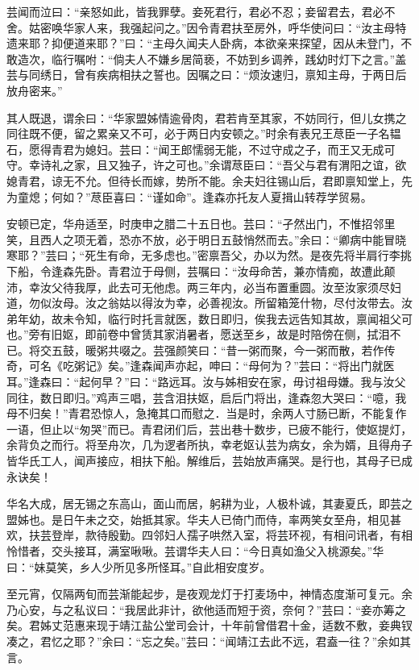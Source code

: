 \documentclass[]{article}
\begin{document}
芸闻而泣曰：``亲怒如此，皆我罪孽。妾死君行，君必不忍；妾留君去，君必不舍。姑密唤华家人来，我强起问之。''因令青君扶至房外，呼华使问曰：``汝主母特遗来耶？抑便道来耶？''曰：``主母久闻夫人卧病，本欲亲来探望，因从未登门，不敢造次，临行嘱咐：``倘夫人不嫌乡居简亵，不妨到乡调养，践幼时灯下之言。''盖芸与同绣日，曾有疾病相扶之誓也。因嘱之曰：``烦汝速归，禀知主母，于两日后放舟密来。''

其人既退，谓余曰：``华家盟姊情逾骨肉，君若肯至其家，不妨同行，但儿女携之同往既不便，留之累亲又不可，必于两日内安顿之。''时余有表兄王荩臣一子名韫石，愿得青君为媳妇。芸曰：``闻王郎懦弱无能，不过守成之子，而王又无成可守。幸诗礼之家，且又独子，许之可也。''余谓荩臣曰：``吾父与君有渭阳之谊，欲媳青君，谅无不允。但待长而嫁，势所不能。余夫妇往锡山后，君即禀知堂上，先为童熄；何如？''荩臣喜曰：``谨如命''。逢森亦托友人夏揖山转荐学贸易。

安顿已定，华舟适至，时庚申之腊二十五日也。芸曰：``孑然出门，不惟招邻里笑，且西人之项无着，恐亦不放，必于明日五鼓悄然而去。''余曰：``卿病中能冒晓寒耶？''芸曰；``死生有命，无多虑也。''密禀吾父，办以为然。是夜先将半肩行李挑下船，令逢森先卧。青君泣于母侧，芸嘱曰：``汝母命苦，兼亦情痴，故遭此颠沛，幸汝父待我厚，此去可无他虑。两三年内，必当布置重圆。汝至汝家须尽妇道，勿似汝母。汝之翁姑以得汝为幸，必善视汝。所留箱笼什物，尽付汝带去。汝弟年幼，故未令知，临行时托言就医，数日即归，俟我去远告知其故，禀闻祖父可也。''旁有旧妪，即前卷中曾赁其家消暑者，愿送至乡，故是时陪傍在侧，拭泪不已。将交五鼓，暖粥共啜之。芸强颜笑曰：``昔一粥而聚，今一粥而散，若作传奇，可名《吃粥记》矣。''逢森闻声亦起，呻曰：``母何为？''芸曰：``将出门就医耳。''逢森曰：``起何早？''曰：``路远耳。汝与姊相安在家，毋讨祖母嫌。我与汝父同往，数日即归。''鸡声三唱，芸含泪扶妪，启后门将出，逢森忽大哭曰：``噫，我母不归矣！''青君恐惊人，急掩其口而慰之．当是时，余两人寸肠已断，不能复作一语，但止以``匆哭''而已。青君闭们后，芸出巷十数步，已疲不能行，使妪提灯，余背负之而行。将至舟次，几为逻者所执，幸老妪认芸为病女，余为婿，且得舟子皆华氏工人，闻声接应，相扶下船。解维后，芸始放声痛哭。是行也，其母子已成永诀矣！

华名大成，居无锡之东高山，面山而居，躬耕为业，人极朴诚，其妻夏氏，即芸之盟姊也。是日午未之交，始抵其家。华夫人已倚门而侍，率两笑女至舟，相见甚欢，扶芸登岸，款待殷勤。四邻妇人孺子哄然入室，将芸环视，有相问讯者，有相怜惜者，交头接耳，满室啾啾。芸谓华夫人曰：``今日真如渔父入桃源矣。''华曰：``妹莫笑，乡人少所见多所怪耳。''自此相安度岁。

至元宵，仅隔两旬而芸渐能起步，是夜观龙灯于打麦场中，神情态度渐可复元。余乃心安，与之私议曰：``我居此非计，欲他适而短于资，奈何？''芸曰：``妾亦筹之矣。君姊丈范惠来现于靖江盐公堂司会计，十年前曾借君十金，适数不敷，妾典钗凑之，君忆之耶？''余曰：``忘之矣。''芸曰：``闻靖江去此不远，君盍一往？''余如其言。
\end{document}
